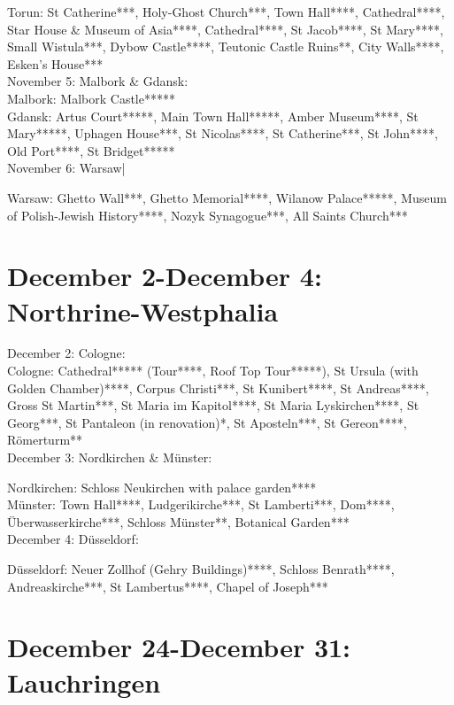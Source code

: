 Torun: St Catherine***, Holy-Ghost Church***, Town Hall****, Cathedral****, Star House \& Museum of Asia****, Cathedral****, St Jacob****, St Mary****, Small Wistula***, Dybow Castle****, Teutonic Castle Ruins**, City Walls****, Esken's House***\\

November 5: Malbork \& Gdansk:\\

Malbork: Malbork Castle*****\\
Gdansk: Artus Court*****, Main Town Hall*****, Amber Museum****, St Mary*****, Uphagen House***, St Nicolas****, St Catherine***, St John****, Old Port****, St Bridget*****\\

November 6: Warsaw|\

Warsaw: Ghetto Wall***, Ghetto Memorial****, Wilanow Palace*****, Museum of Polish-Jewish History****, Nozyk Synagogue***, All Saints Church***\\

\section{December 2-December 4: Northrine-Westphalia}
\label{2022:Dusseldorf}

December 2: Cologne:\\

Cologne: Cathedral***** (Tour****, Roof Top Tour*****), St Ursula (with Golden Chamber)****, Corpus Christi***, St Kunibert****, St Andreas****, Gross St Martin***, St Maria im Kapitol****, St Maria Lyskirchen****, St Georg***, St Pantaleon (in renovation)*, St Aposteln***, St Gereon****, R\"omerturm**\\

December 3: Nordkirchen \& M\"unster:

Nordkirchen: Schloss Neukirchen with palace garden****\\
M\"unster: Town Hall****, Ludgerikirche***, St Lamberti***, Dom****, \"Uberwasserkirche***, Schloss M\"unster**, Botanical Garden***\\

December 4: D\"usseldorf:

D\"usseldorf: Neuer Zollhof (Gehry Buildings)****, Schloss Benrath****, Andreaskirche***, St Lambertus****, Chapel of Joseph***\\

\section{December 24-December 31: Lauchringen}
\label{2022:Lauchringen}

